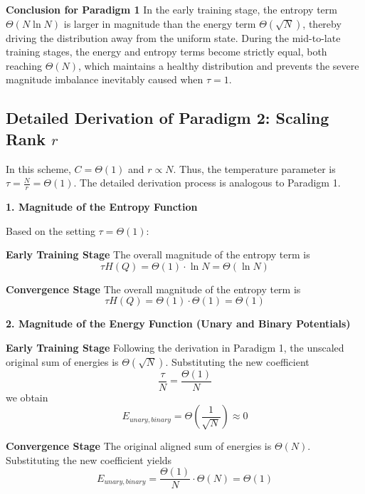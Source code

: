 \documentclass[11pt]{article}
\begin{document}
\textbf{Conclusion for Paradigm 1} In the early training stage, the entropy term $\Theta(N \ln N)$ is larger in magnitude than the energy term $\Theta(\sqrt{N})$, thereby driving the distribution away from the uniform state. During the mid-to-late training stages, the energy and entropy terms become strictly equal, both reaching $\Theta(N)$, which maintains a healthy distribution and prevents the severe magnitude imbalance inevitably caused when $\tau=1$.

\subsection{Detailed Derivation of Paradigm 2: Scaling Rank $r$}

In this scheme, $C = \Theta(1)$ and $r \propto N$. Thus, the temperature parameter is 
$\tau = \frac{N}{r} = \Theta(1)$. The detailed derivation process is analogous to Paradigm 1.

\textbf{1. Magnitude of the Entropy Function}

Based on the setting $\tau = \Theta(1)$:

\textbf{Early Training Stage} The overall magnitude of the entropy term is 
\begin{equation}
    \tau H(Q) = \Theta(1) \cdot \ln N = \Theta(\ln N)
\end{equation}

\textbf{Convergence Stage} The overall magnitude of the entropy term is 
\begin{equation}
    \tau H(Q) = \Theta(1) \cdot \Theta(1) = \Theta(1)
\end{equation}

\textbf{2. Magnitude of the Energy Function (Unary and Binary Potentials)}

\textbf{Early Training Stage} Following the derivation in Paradigm 1, the unscaled original sum of energies is $\Theta(\sqrt{N})$. Substituting the new coefficient 
\begin{equation}
    \frac{\tau}{N} = \frac{\Theta(1)}{N}
\end{equation}
we obtain
\begin{equation}
    E_{unary, binary} = \Theta(\frac{1}{\sqrt{N}}) \approx 0
\end{equation}

\textbf{Convergence Stage} The original aligned sum of energies is $\Theta(N)$. Substituting the new coefficient yields
\begin{equation}
    E_{unary, binary} = \frac{\Theta(1)}{N} \cdot \Theta(N) = \Theta(1)
\end{equation}
\end{document}
